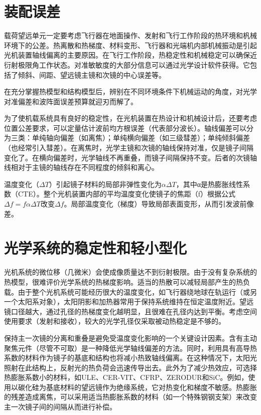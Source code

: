 \begin{figure}[!htbp]
\begin{subfigure}[c]{0.5\textwidth}
		\caption{}
		\label{RCcijing002.png}
	\end{subfigure}
	\label{fig:Second-MIRROR}
\end{figure}

\section{装配误差}
载荷望远单元一定要考虑飞行器在地面操作、发射和飞行工作阶段的热环境和杋械环境下的公差。热离散和热梯度、材料变形、飞行器和光端机内部机械振动是引起光机装置轴线偏离的主要原因。在飞行工作阶段，热稳定性和机械稳定可以确保近衍射极限角工作状态。对准敏敏度的大部分信息可以通过光学设计软件获得。它包括了倾斜、间距、望远镜主镜和次镜的中心误差等。

在充分掌握热模型和结构模型后，辨别在不同环境条件下机械运动的角度，对光学对准偏差和波阵面误差预算就迎刃而解了。

为了使机载系统具有良好的稳定性，在光机装置在热设计和机械设计后，还要考虑位置公差要求，可以定量估计波前均方根误差（代表部分波长）。轴线偏差可以分为三类：单纯轴向偏差（如离焦）；单纯横向偏差（如三级彗差）；单纯倾斜偏差（也经常引入彗差）。在离焦时，光学主镜和次镜的轴线保持对准，仅是镜子间隔变化了。在横向偏差时，光学轴线不再重叠，而镜子间隔保持不变。后者的次镜轴线相对于主镜的轴线存在不同程度的倾斜和离心。

温度变化（$\Delta T$）引起镜子材料的局部非弹性变化为$\alpha \Delta T$，其中α是热膨胀线性系数（CTE）。整个光机装置内部的平均温度变化使镜子的焦距（f）根据公式$\Delta f = f\alpha \Delta T$改变$\Delta f $。局部温度变化（梯度）导致局部表面变形，从而引发波前像差。

\section{光学系统的稳定性和轻小型化}
光机系统的微位移（几微米）会使成像质量达不到衍射极限。由于没有复杂系统的热模型，很难评价光学系统的热梯度影响。适当的热散可以减轻局部产生的热负载。由于整个光机系统可能经历很大的温度变化，如飞行器绕地球在轨运行（或另一个太阳系对象），太阳阴影和加热器常用于保持系统维持在恒定温度附近。望远镜口径越大，通过孔径的热梯度变化越明显，且很难在孔径内达到平衡。考虑空间使用要求（发射和接收），较大的光学孔径仅采取被动热稳定是不够的。

保持主一次镜的分离和重叠是避免受温度变化影响的一个关键设计因素。含有主动聚焦元件（尽管不可取）是一种降低光学轴线偏差的方法。同时，利用具有高导热系数的材料作为镜子的基底和结构也将减小热致轴线偏离。在这种情况下，太阳光照射在此结构上，反射光的热负荷会迅速传导出去。此外为了减少热效应，可选择热膨胀系数小的材料，如ULE、CER-VIT、CFRP、ZERODUR和SiC。例如，使用以碳化硅为基底材料的望远镜作为绝缘系统，它对热变化和梯度不敏感。热膨胀的残差造成离焦，可以采用适当热膨胀系数的材料（如一个特殊钢钢支架）来改变主一次镜子间的间隔从而进行补偿。

